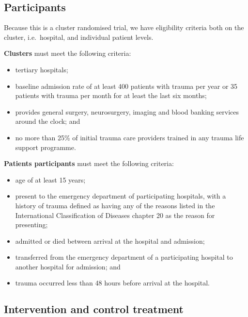 \documentclass[
  11pt,
]{article}
\providecommand{\tightlist}{%
  \setlength{\itemsep}{0pt}\setlength{\parskip}{0pt}}
\begin{document}
\hypertarget{participants}{%
\subsection{Participants}\label{participants}}

Because this is a cluster randomised trial, we have eligibility criteria both on the cluster, i.e.~hospital, and individual patient levels.

\textbf{Clusters} must meet the following criteria:

\begin{itemize}
\tightlist
\item
  tertiary hospitals;
\item
  baseline admission rate of at least 400 patients with trauma per year or 35 patients with trauma per month for at least the last six months;
\item
  provides general surgery, neurosurgery, imaging and blood banking services around the clock; and
\item
  no more than 25\% of initial trauma care providers trained in any trauma life support programme.
\end{itemize}

\textbf{Patients participants} must meet the following criteria:

\begin{itemize}
\tightlist
\item
  age of at least 15 years;
\item
  present to the emergency department of participating hospitals, with a history of trauma defined as having any of the reasons listed in the International Classification of Diseases chapter 20 as the reason for presenting;
\item
  admitted or died between arrival at the hospital and admission;
\item
  transferred from the emergency department of a participating hospital to another hospital for admission; and
\item
  trauma occurred less than 48 hours before arrival at the hospital.
\end{itemize}

\hypertarget{intervention-and-control-treatment}{%
\subsection{Intervention and control treatment}\label{intervention-and-control-treatment}}
\end{document}
